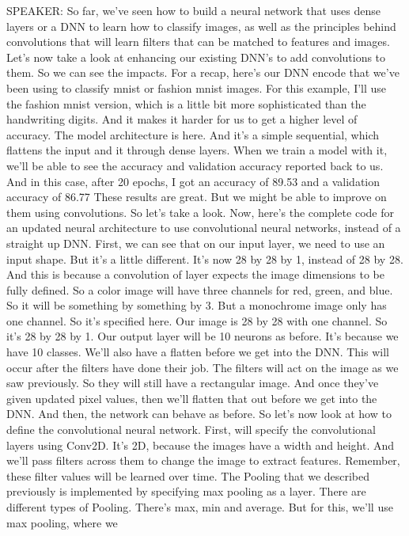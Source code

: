 SPEAKER: So far, we've seen how to build a neural network that
uses dense layers or a DNN to learn how to classify images,
as well as the principles behind convolutions
that will learn filters that can be matched to features and images.
Let's now take a look at enhancing our existing DNN's
to add convolutions to them.
So we can see the impacts.
For a recap, here's our DNN encode that we've
been using to classify mnist or fashion mnist images.
For this example, I'll use the fashion mnist
version, which is a little bit more sophisticated than the handwriting
digits.
And it makes it harder for us to get a higher level of accuracy.
The model architecture is here.
And it's a simple sequential, which flattens the input and it
through dense layers.
When we train a model with it, we'll be able to see the accuracy and validation
accuracy reported back to us.
And in this case, after 20 epochs, I got an accuracy of 89.53%
and a validation accuracy of 86.77%
These results are great.
But we might be able to improve on them using convolutions.
So let's take a look.
Now, here's the complete code for an updated neural architecture
to use convolutional neural networks, instead of a straight up DNN.
First, we can see that on our input layer, we need to use an input shape.
But it's a little different.
It's now 28 by 28 by 1, instead of 28 by 28.
And this is because a convolution of layer
expects the image dimensions to be fully defined.
So a color image will have three channels for red, green, and blue.
So it will be something by something by 3.
But a monochrome image only has one channel.
So it's specified here.
Our image is 28 by 28 with one channel.
So it's 28 by 28 by 1.
Our output layer will be 10 neurons as before.
It's because we have 10 classes.
We'll also have a flatten before we get into the DNN.
This will occur after the filters have done their job.
The filters will act on the image as we saw previously.
So they will still have a rectangular image.
And once they've given updated pixel values,
then we'll flatten that out before we get into the DNN.
And then, the network can behave as before.
So let's now look at how to define the convolutional neural network.
First, will specify the convolutional layers using Conv2D.
It's 2D, because the images have a width and height.
And we'll pass filters across them to change the image to extract features.
Remember, these filter values will be learned over time.
The Pooling that we described previously is implemented
by specifying max pooling as a layer.
There are different types of Pooling.
There's max, min and average.
But for this, we'll use max pooling, where we
